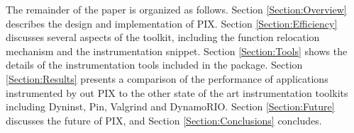 The remainder of the paper is organized as follows. Section
\ref{Section:Overview} describes the design and implementation of PIX.
Section \ref{Section:Efficiency} discusses
several aspects of the toolkit, including the function relocation mechanism and the
instrumentation snippet. Section \ref{Section:Tools} shows the details of
the instrumentation tools included in the package. Section \ref{Section:Results}
presents a comparison of the performance of applications instrumented by out PIX to
the other state of the art instrumentation toolkits including Dyninst, Pin, Valgrind and DynamoRIO. Section
\ref{Section:Future} discusses the future of PIX, and Section \ref{Section:Conclusions} concludes.
